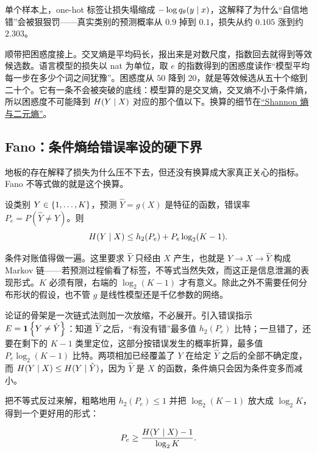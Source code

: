 单个样本上，one-hot 标签让损失塌缩成 \(-\log q_\theta(y\mid x)\)，这解释了为什么``自信地错''会被狠狠罚——真实类别的预测概率从 \(0.9\) 掉到 \(0.1\)，损失从约 \(0.105\) 涨到约 \(2.303\)。

顺带把困惑度接上。交叉熵是平均码长，报出来是对数尺度，指数回去就得到等效候选数。语言模型的损失以 nat 为单位，取 \(e\) 的指数得到的困惑度读作``模型平均每一步在多少个词之间犹豫''。困惑度从 \(50\) 降到 \(20\)，就是等效候选从五十个缩到二十个。它有一条不会被突破的底线：模型算的是交叉熵，交叉熵不小于条件熵，所以困惑度不可能降到 \(H(Y\mid X)\) 对应的那个值以下。换算的细节在\hyperref[sec:07-Information-Theory/01-Information-and-Entropy/02]{``Shannon 熵与二元熵''}。

\subsection{Fano：条件熵给错误率设的硬下界}

地板的存在解释了损失为什么压不下去，但还没有换算成大家真正关心的指标。Fano 不等式做的就是这个换算。

\begin{theorem}
设类别 \(Y\in\left\{1,\dots,K\right\}\)，预测 \(\hat Y=g(X)\) 是特征的函数，错误率 \(P_e=P(\hat Y\ne Y)\)。则
\[
H(Y\mid X)\le h_2(P_e)+P_e\log_2(K-1).
\]
\end{theorem}

条件对账值得做一遍。这里要求 \(\hat Y\) 只经由 \(X\) 产生，也就是 \(Y\to X\to\hat Y\) 构成 Markov 链——若预测过程偷看了标签，不等式当然失效，而这正是信息泄漏的表现形式。\(K\) 必须有限，右端的 \(\log_2(K-1)\) 才有意义。除此之外不需要任何分布形状的假设，也不管 \(g\) 是线性模型还是千亿参数的网络。

论证的骨架是一次链式法则加一次放缩，不必展开。引入错误指示 \(E=\mathbf{1}\left\{Y\ne\hat Y\right\}\)：知道 \(\hat Y\) 之后，``有没有错''最多值 \(h_2(P_e)\) 比特；一旦错了，还要在剩下的 \(K-1\) 类里定位，这部分按错误发生的概率折算，最多值 \(P_e\log_2(K-1)\) 比特。两项相加已经覆盖了 \(Y\) 在给定 \(\hat Y\) 之后的全部不确定度，而 \(H(Y\mid X)\le H(Y\mid\hat Y)\)，因为 \(\hat Y\) 是 \(X\) 的函数，条件熵只会因为条件变多而减小。

把不等式反过来解，粗略地用 \(h_2(P_e)\le 1\) 并把 \(\log_2(K-1)\) 放大成 \(\log_2 K\)，得到一个更好用的形式：

\[
P_e\ge\frac{H(Y\mid X)-1}{\log_2 K}.
\]

